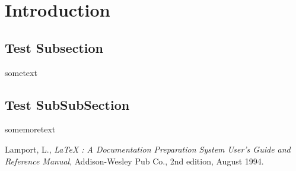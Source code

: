 \documentclass[11pt]{article}
\begin{document}
\section{Introduction}
\label{Introduction}
\subsection{Test Subsection}
\label{testSubsection}
sometext
\subsection{Test SubSubSection}
\label{testSubSubSection}
somemoretext
\begin{thebibliography}{99}
 Lamport, L., {\it LaTeX : A Documentation
 Preparation System User's Guide and Reference Manual}, Addison-Wesley 
 Pub Co., 2nd edition, August 1994.
\end{thebibliography}
\end{document}
